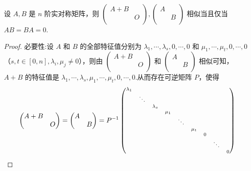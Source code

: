 \documentclass[../../main.tex]{subfiles}
\begin{document}
\begin{corollary}
设 $A,B$ 是 $n$ 阶实对称矩阵，则
$
\left( \begin{matrix}
A+B&		\\
&		O\\
\end{matrix} \right) , \left( \begin{matrix}
A&		\\
&		B	\\
\end{matrix} \right)
$
相似当且仅当 $AB=BA=0$.
\end{corollary}
\begin{proof}
{\heiti 必要性:}设 $A$ 和 $B$ 的全部特征值分别为 $\lambda _1,\cdots ,\lambda _s,0,\cdots ,0$ 和 $\mu _1,\cdots ,\mu _t,0,\cdots ,0$（$s,t\in [0,n],\lambda _i,\mu _j\ne 0$），则由 $\begin{pmatrix}
A+B&		\\
&		O\\
\end{pmatrix}$ 和 $\begin{pmatrix}
A&		\\
&		B		\\
\end{pmatrix}$ 相似可知，$A+B$ 的特征值是 $\lambda _1,\cdots ,\lambda _s,\mu _1,\cdots ,\mu _t,0,\cdots ,0$.从而存在可逆矩阵 $P$，使得
\begin{align*}
\begin{pmatrix}
A+B&		\\
&		O\\
\end{pmatrix} =\begin{pmatrix}
A&		\\
&		B		\\
\end{pmatrix} =P^{-1}\begin{scriptsize}
\begin{pmatrix}
\lambda _1&		&		&		&		&		&		&		&		\\
&		\ddots&		&		&		&		&		&		&		\\
&		&		\lambda _s&		&		&		&		&		&		\\
&		&		&		\mu _1&		&		&		&		&		\\
&		&		&		&		\ddots&		&		&		&		\\
&		&		&		&		&		\mu _t&		&		&		\\
&		&		&		&		&		&		0&		&		\\
&		&		&		&		&		&		&		\ddots&		\\
&		&		&		&		&		&		&		&		0\\

\end{pmatrix}
\end{scriptsize}
\end{align*}
\end{proof}
\end{document}
